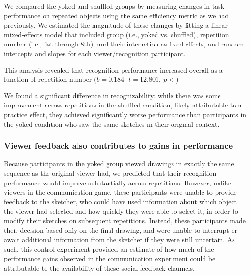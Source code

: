 \documentclass[10pt,letterpaper]{article}
\begin{document}
We compared the yoked and shuffled groups by measuring changes in task performance on repeated objects using the same efficiency metric as we had previously. 
We estimated the magnitude of these changes by fitting a linear mixed-effects model that included group (i.e., yoked vs. shuffled), repetition number (i.e., 1st through 8th), and their interaction as fixed effects, and random intercepts and slopes for each viewer/recognition participant. 

This analysis revealed that recognition performance increased overall as a function of repetition number ($b = 0.184, ~t = 12.801, ~p < $)


We found a significant difference in recognizability: while there was some improvement across repetitions in the shuffled condition, likely attributable to a practice effect, they achieved significantly worse performance than participants in the yoked condition who saw the same sketches in their original context. 


\subsubsection{Viewer feedback also contributes to gains in performance}

Because participants in the yoked group viewed drawings in exactly the same sequence as the original viewer had, we predicted that their recognition performance would improve substantially across repetitions. 
However, unlike viewers in the communication game, these participants were unable to provide feedback to the sketcher, who could have used information about which object the viewer had selected and how quickly they were able to select it, in order to modify their sketches on subsequent repetitions. 
Instead, these participants made their decision based only on the final drawing, and were unable to interrupt or await additional information from the sketcher if they were still uncertain.
As such, this control experiment provided an estimate of how much of the performance gains observed in the communication experiment could be attributable to the availability of these social feedback channels.
\end{document}
